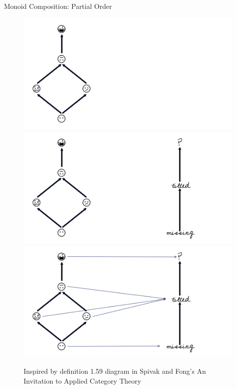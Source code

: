 \documentclass[xcolor={dvipsnames}, handout]{beamer}
\begin{document}
\begin{frame}{Monoid Composition: Partial Order}
    \begin{figure}
        \begin{overprint}
            \includegraphics[width=1\linewidth]{figures/math/monoid_hasse.png}
            \includegraphics[width=1\linewidth]{figures/math/monoid_monotone.png}
            \includegraphics[width=1\linewidth]{figures/math/monoid_maps.png}
        \end{overprint}
    \caption{Inspired by definition 1.59 diagram in Spivak and Fong's An Invitation to Applied Category Theory \cite{fongInvitationAppliedCategory2019}}
    \end{figure}
\end{frame}
\end{document}
